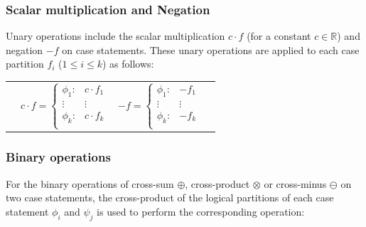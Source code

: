 \documentclass[twoside,11pt]{article}
\begin{document}
\subsubsection*{Scalar multiplication and Negation}
Unary operations include the scalar multiplication $c\cdot f$ (for
a constant $c \in \mathbb{R}$) and negation $-f$ on case statements. These unary operations are applied to each case partition
$f_i$ ($1 \leq i \leq k$) as follows:
{%
\begin{center}
\begin{tabular}{r c c l}
&
  $c \cdot f = \begin{cases}
    \phi_1  : & c \cdot f_1 \\ 
   \vdots&\vdots\\ 
    \phi_k : & c \cdot f_k \\ 
  \end{cases}$
 &
\hspace{10mm}
  $-f = \begin{cases}
    \phi_1 : & - f_1 \\ 
   \vdots&\vdots\\ 
    \phi_k : & - f_k \\ 
  \end{cases}$
\end{tabular}
\end{center}
}
\subsubsection*{Binary operations}
For the binary operations of cross-sum $\oplus$, cross-product $\otimes$ or cross-minus $\ominus$ on two case statements, the cross-product
of the logical partitions of each case statement  $\phi_i$ and $\psi_j$ is used to perform the
corresponding operation:
\end{document}
